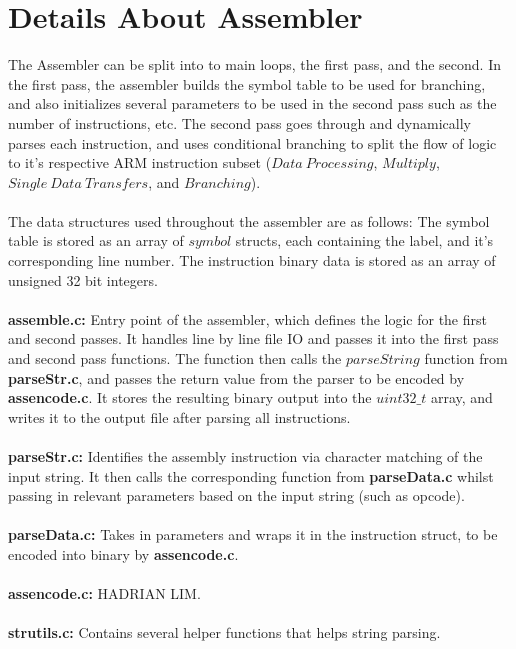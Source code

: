 \documentclass[a4paper]{article}
\begin{document}
\newpage



\section{Details About Assembler}
The Assembler can be split into to main loops, the first pass, and the second. In the first pass, the assembler builds the symbol table to be used for branching, and also initializes several parameters to be used in the second pass such as the number of instructions, etc. The second pass goes through and dynamically parses each instruction, and uses conditional branching to split the flow of logic to it's respective ARM instruction subset ($Data\ Processing$, $Multiply$, $Single\ Data\ Transfers$, and $Branching$).
\\\\
The data structures used throughout the assembler are as follows: The symbol table is stored as an array of $symbol$ structs, each containing the label, and it's corresponding line number. The instruction binary data is stored as an array of unsigned 32 bit integers.
\\\\
\textbf{assemble.c:} Entry point of the assembler, which defines the logic for the first and second passes. It handles line by line file IO and passes it into the first pass and second pass functions. The function then calls the $parseString$ function from \textbf{parseStr.c}, and passes the return value from the parser to be encoded by \textbf{assencode.c}. It stores the resulting binary output into the $uint32\_t$ array, and writes it to the output file after parsing all instructions.
\\\\
\textbf{parseStr.c:} Identifies the assembly instruction via character matching of the input string. It then calls the corresponding function from \textbf{parseData.c} whilst passing in relevant parameters based on the input string (such as opcode).
\\\\
\textbf{parseData.c:} Takes in parameters and wraps it in the instruction struct, to be encoded into binary by \textbf{assencode.c}.
\\\\
\textbf{assencode.c:} HADRIAN LIM.
\\\\
\textbf{strutils.c:} Contains several helper functions that helps string parsing. 
\end{document}
